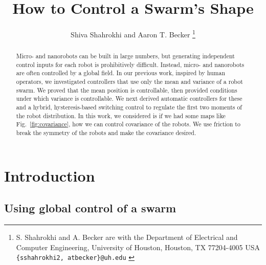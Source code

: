 \documentclass[letterpaper, 10 pt, conference]{ieeeconf}
\begin{document}
\title{\LARGE \bf How to Control a Swarm's Shape}
\author{Shiva Shahrokhi and  Aaron T. Becker%
\thanks{{S. Shahrokhi and A. Becker are with the Department of Electrical and Computer Engineering,  University of Houston, Houston, TX 77204-4005 USA {\tt\small  \{sshahrokhi2, atbecker\}@uh.edu}
}
} %
} %
\maketitle

\begin{abstract}

Micro- and nanorobots can be built in large numbers, but generating independent control inputs for each robot is prohibitively difficult.  Instead, micro- and nanorobots are often controlled by a global field. In our previous work, inspired by human operators, we investigated controllers that use only the mean and variance of a robot swarm. We proved that the mean position is controllable, then provided conditions under which variance is controllable.  We next derived automatic controllers for these and a hybrid, hysteresis-based switching control to regulate the first two moments of the robot distribution. In this work, we considered is if we had some maps like Fig.~\ref{fig:covariance}, how we can control covariance of the robots. We use friction to break the symmetry of the robots and make the covariance desired. 
\end{abstract}


\section{Introduction}

\subsection{Using global control of a swarm }
\end{document}
